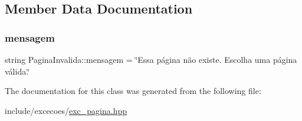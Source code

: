 \subsection{Member Data Documentation}
\mbox{\label{classPaginaInvalida_aebeaffd6e9c09496a4a9d6ed2b87d0f9}} 
\subsubsection{\texorpdfstring{mensagem}{mensagem}}
{\footnotesize\ttfamily string Pagina\+Invalida\+::mensagem = \char`\"{}Essa página não existe. Escolha uma página válida.\char`\"{}\hspace{0.3cm}{\ttfamily [private]}}



The documentation for this class was generated from the following file\+:\begin{DoxyCompactItemize}
\item 
include/excecoes/\hyperlink{exc__pagina_8hpp}{exc\+\_\+pagina.\+hpp}\end{DoxyCompactItemize}
